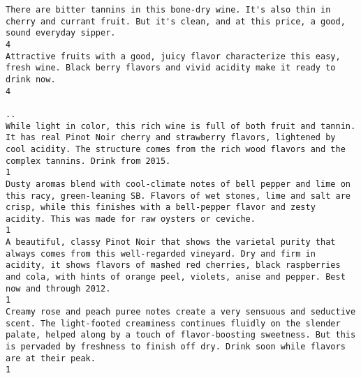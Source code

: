 \documentclass[11pt]{article}
\begin{document}
\begin{Verbatim}[commandchars=\\\{\}]
There are bitter tannins in this bone-dry wine. It's also thin in cherry and currant fruit. But it's clean, and at this price, a good, sound everyday sipper.                                                                                                                                                                                                                                                  4
Attractive fruits with a good, juicy flavor characterize this easy, fresh wine. Black berry flavors and vivid acidity make it ready to drink now.                                                                                                                                                                                                                                                              4
                                                                                                                                                                                                                                                                                                                                                                                                              ..
While light in color, this rich wine is full of both fruit and tannin. It has real Pinot Noir cherry and strawberry flavors, lightened by cool acidity. The structure comes from the rich wood flavors and the complex tannins. Drink from 2015.                                                                                                                                                               1
Dusty aromas blend with cool-climate notes of bell pepper and lime on this racy, green-leaning SB. Flavors of wet stones, lime and salt are crisp, while this finishes with a bell-pepper flavor and zesty acidity. This was made for raw oysters or ceviche.                                                                                                                                                  1
A beautiful, classy Pinot Noir that shows the varietal purity that always comes from this well-regarded vineyard. Dry and firm in acidity, it shows flavors of mashed red cherries, black raspberries and cola, with hints of orange peel, violets, anise and pepper. Best now and through 2012.                                                                                                               1
Creamy rose and peach puree notes create a very sensuous and seductive scent. The light-footed creaminess continues fluidly on the slender palate, helped along by a touch of flavor-boosting sweetness. But this is pervaded by freshness to finish off dry. Drink soon while flavors are at their peak.                                                                                                      1

\end{Verbatim}
\end{document}
